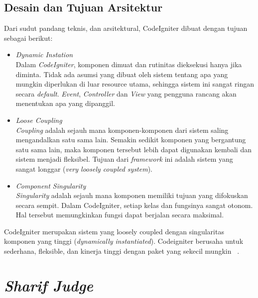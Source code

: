 \subsection{Desain dan Tujuan Arsitektur}
Dari sudut pandang teknis, dan arsitektural, CodeIgniter dibuat dengan tujuan sebagai berikut:
\begin{itemize}
	\item \textit{Dynamic Instation} \\
	Dalam \textit{CodeIgniter}, komponen dimuat dan rutinitas dieksekusi hanya jika diminta. Tidak ada asumsi yang dibuat oleh sistem tentang apa yang mungkin diperlukan di luar resource utama, sehingga sistem ini sangat ringan secara \textit{default}. \textit{Event}, \textit{Controller} dan \textit{View} yang pengguna rancang akan menentukan apa yang dipanggil.
	\item \textit{Loose Coupling} \\
	\textit{Coupling} adalah sejauh mana komponen-komponen dari sistem saling mengandalkan satu sama lain. Semakin sedikit komponen yang bergantung satu sama lain, maka komponen tersebut lebih dapat digunakan kembali dan sistem menjadi fleksibel. Tujuan dari \textit{framework} ini adalah sistem yang sangat longgar (\textit{very loosely coupled system}).
	\item \textit{Component Singularity} \\
	\textit{Singularity} adalah sejauh mana komponen memiliki tujuan yang difokuskan secara sempit. Dalam CodeIgniter, setiap kelas dan fungsinya sangat otonom. Hal tersebut memungkinkan fungsi dapat berjalan secara maksimal.
\end{itemize}

CodeIgniter merupakan sistem yang loosely coupled dengan singularitas komponen yang tinggi (\textit{dynamically instantiated}). Codeigniter berusaha untuk sederhana, fleksible, dan kinerja tinggi dengan paket yang sekecil mungkin ~\cite{bcit:17:cidoc}.

\section{\textit{Sharif Judge}}
\label{sec:sharifjudge} 

